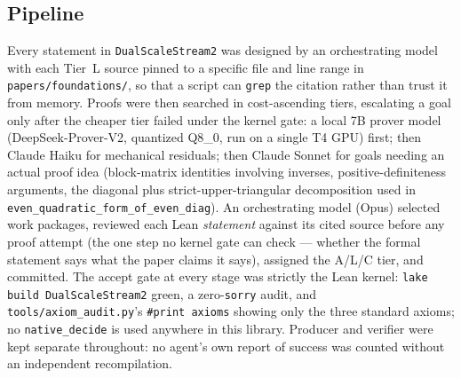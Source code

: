 \documentclass[11pt,a4paper]{article}
\theoremstyle{remark}
\begin{document}
\subsection{Pipeline}
Every statement in \texttt{DualScaleStream2} was designed by an orchestrating model with each
Tier~L source pinned to a specific file and line range in \texttt{papers/foundations/}, so that a
script can \texttt{grep} the citation rather than trust it from memory. Proofs were then searched
in cost-ascending tiers, escalating a goal only after the cheaper tier failed under the kernel
gate: a local 7B prover model (DeepSeek-Prover-V2, quantized Q8\_0, run on a single T4 GPU) first;
then Claude Haiku for mechanical residuals; then Claude Sonnet for goals needing an actual proof
idea (block-matrix identities involving inverses, positive-definiteness arguments, the diagonal
plus strict-upper-triangular decomposition used in \texttt{even\_quadratic\_form\_of\_even\_diag}).
An orchestrating model (Opus) selected work packages, reviewed each Lean \emph{statement} against
its cited source before any proof attempt (the one step no kernel gate can check --- whether the
formal statement says what the paper claims it says), assigned the A/L/C tier, and committed. The
accept gate at every stage was strictly the Lean kernel: \texttt{lake build DualScaleStream2}
green, a zero-\texttt{sorry} audit, and \texttt{tools/axiom\_audit.py}'s \texttt{\#print axioms}
showing only the three standard axioms; no \texttt{native\_decide} is used anywhere in this
library. Producer and verifier were kept separate throughout: no agent's own report of success was
counted without an independent recompilation.
\end{document}
